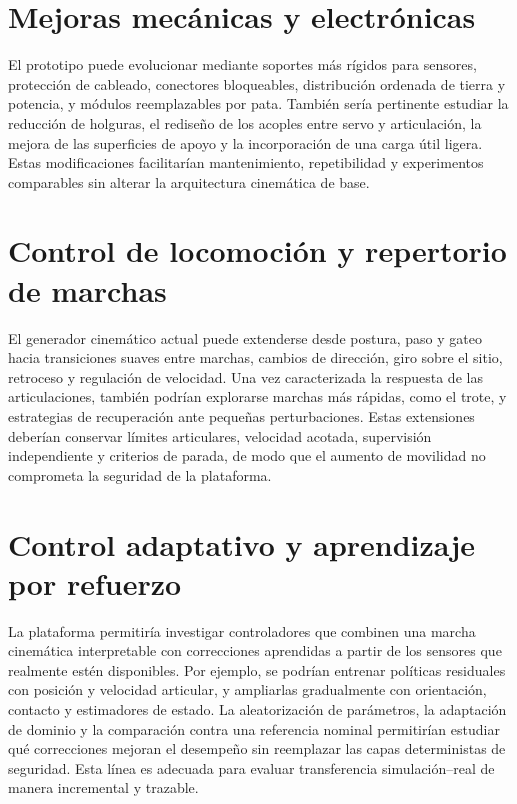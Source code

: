 \section{Mejoras mecánicas y electrónicas}

El prototipo puede evolucionar mediante soportes más rígidos para sensores,
protección de cableado, conectores bloqueables, distribución ordenada de tierra
y potencia, y módulos reemplazables por pata. También sería pertinente estudiar
la reducción de holguras, el rediseño de los acoples entre servo y articulación,
la mejora de las superficies de apoyo y la incorporación de una carga útil
ligera. Estas modificaciones facilitarían mantenimiento, repetibilidad y
experimentos comparables sin alterar la arquitectura cinemática de base.

\section{Control de locomoción y repertorio de marchas}

El generador cinemático actual puede extenderse desde postura, paso y gateo
hacia transiciones suaves entre marchas, cambios de dirección, giro sobre el
sitio, retroceso y regulación de velocidad. Una vez caracterizada la respuesta
de las articulaciones, también podrían explorarse marchas más rápidas, como el
trote, y estrategias de recuperación ante pequeñas perturbaciones. Estas
extensiones deberían conservar límites articulares, velocidad acotada,
supervisión independiente y criterios de parada, de modo que el aumento de
movilidad no comprometa la seguridad de la plataforma.

\section{Control adaptativo y aprendizaje por refuerzo}

La plataforma permitiría investigar controladores que combinen una marcha
cinemática interpretable con correcciones aprendidas a partir de los sensores
que realmente estén disponibles. Por ejemplo, se podrían entrenar políticas
residuales con posición y velocidad articular, y ampliarlas gradualmente con
orientación, contacto y estimadores de estado. La aleatorización de parámetros,
la adaptación de dominio y la comparación contra una referencia nominal
permitirían estudiar qué correcciones mejoran el desempeño sin reemplazar las
capas deterministas de seguridad. Esta línea es adecuada para evaluar
transferencia simulación--real de manera incremental y trazable.

